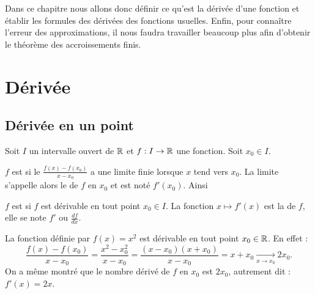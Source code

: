 \documentclass[class=report,crop=false]{standalone}
\begin{document}
Dans ce chapitre nous allons donc définir ce qu'est la dérivée d'une fonction et établir les formules des dérivées des fonctions usuelles.
Enfin, pour connaître l'erreur des approximations, il nous faudra travailler beaucoup plus
afin d'obtenir le théorème des accroissements finis.


\section{Dérivée}

\subsection{Dérivée en un point}

Soit $I$ un intervalle ouvert de $\mathbb{R}$ et $f : I \to \mathbb{R}$ une fonction. Soit $x_0 \in I$.

\begin{definition}
$f$ est  si le  $\frac{f(x)-f(x_0)}{x-x_0}$
a une limite finie lorsque $x$ tend vers $x_0$.
La limite s'appelle alors le  de $f$ en $x_0$ et est noté $f'(x_0)$. Ainsi
\end{definition}


\begin{definition}
$f$ est  si $f$ est dérivable en tout point $x_0 \in I$.
La fonction $x \mapsto f'(x)$ est la  de $f$,
elle se note $f'$ ou $\frac{df}{dx}$.
\end{definition}


\begin{exemple}
La fonction définie par $f(x)=x^2$  est dérivable en tout point $x_0 \in \mathbb{R}$. En effet :
$$\frac{f(x)-f(x_0)}{x-x_0} = \frac{x^2-x_0^2}{x-x_0} = \frac{(x-x_0)(x+x_0)}{x-x_0}=x+x_0 \xrightarrow[x \to x_0]{} 2x_0.$$
On a même montré que le nombre dérivé de $f$ en $x_0$ est $2x_0$, autrement dit : $f'(x)=2x$.
\end{exemple}
\end{document}
